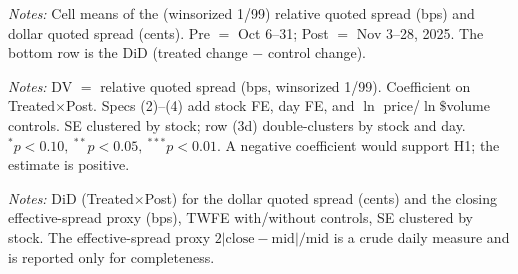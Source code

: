 \documentclass[12pt]{article}
\begin{document}
\begin{table}[htbp]\centering
\begin{threeparttable}
\caption{Difference-in-differences 2$\times$2 means}\label{tab:did2x2}
\small

\begin{tablenotes}\small
\item \textit{Notes:} Cell means of the (winsorized 1/99) relative quoted spread (bps) and
dollar quoted spread (cents). Pre $=$ Oct 6--31; Post $=$ Nov 3--28, 2025. The bottom row is
the DiD (treated change $-$ control change).
\end{tablenotes}
\end{threeparttable}
\end{table}

\begin{table}[htbp]\centering
\begin{threeparttable}
\caption{Main DiD: relative quoted spread (bps)}\label{tab:did_main}
\small

\begin{tablenotes}\small
\item \textit{Notes:} DV $=$ relative quoted spread (bps, winsorized 1/99). Coefficient on
Treated$\times$Post. Specs (2)--(4) add stock FE, day FE, and $\ln$ price/$\ln\$$volume
controls. SE clustered by stock; row (3d) double-clusters by stock and day.
$^{*}p<0.10,\ ^{**}p<0.05,\ ^{***}p<0.01$. A negative coefficient would support H1; the
estimate is positive.
\end{tablenotes}
\end{threeparttable}
\end{table}

\begin{table}[htbp]\centering
\begin{threeparttable}
\caption{Alternative outcomes}\label{tab:altoutcomes}
\small

\begin{tablenotes}\small
\item \textit{Notes:} DiD (Treated$\times$Post) for the dollar quoted spread (cents) and the
closing effective-spread proxy (bps), TWFE with/without controls, SE clustered by stock.
The effective-spread proxy $2|\text{close}-\text{mid}|/\text{mid}$ is a crude daily measure
and is reported only for completeness.
\end{tablenotes}
\end{threeparttable}
\end{table}
\end{document}
